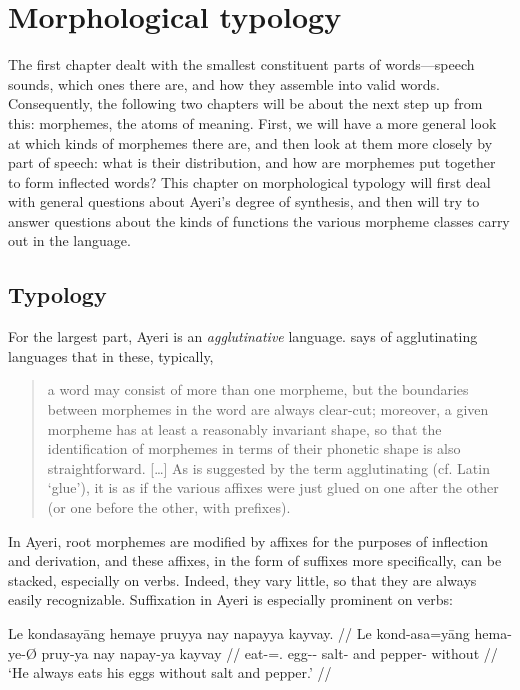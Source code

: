 
\chapter{Morphological typology}

The first chapter dealt with the smallest constituent parts of words---speech 
sounds, which ones there are, and how they assemble into valid words. 
Consequently, the following two chapters will be about the next step up from 
this: morphemes, the atoms of meaning. First, we will have a more general look 
at which kinds of morphemes there are, and then look at them more closely by 
part of speech: what is their distribution, and how are morphemes put together 
to form inflected words? This chapter on morphological typology will first 
deal with general questions about Ayeri's degree of synthesis, and then will
try to answer questions about the kinds of functions the various morpheme
classes carry out in the language.

\section{Typology}
\label{sec:typology}

For the largest part, Ayeri is an \emph{agglutinative} 
language. \citet{comrie1989} says of agglutinating languages that in these, 
typically,

\blockcquote[43--44]{comrie1989}{a word may consist of more than one morpheme,
but the boundaries between morphemes in the word are always clear-cut;
moreover, a given morpheme has at least a reasonably invariant shape, so that
the identification of morphemes in terms of their phonetic shape is also
straightforward. […] As is suggested by the term agglutinating (cf. Latin
 `glue'), it is as if the various affixes were just glued on one 
after the other (or one before the other, with prefixes).}

In Ayeri, root morphemes are modified by affixes for the purposes of inflection
and derivation, and these affixes, in the form of suffixes more
specifically, can be stacked, especially on verbs. Indeed, they vary little, so
that they are always easily recognizable. Suffixation in Ayeri is especially
prominent on verbs:

\ex\begingl
	\gla Le kondasayāng hemaye pruyya nay napayya kayvay. //
	\glb Le kond-asa=yāng hema-ye-Ø pruy-ya nay napay-ya kayvay //
	\glc \PatTI{} eat-\Hab{}=\TsgM{}.\Aarg{} egg-\Pl{}-\Top{} salt-\Loc{} 
		and pepper-\Loc{} without //
	\glft `He always eats his eggs without salt and pepper.' //
\endgl\xe

